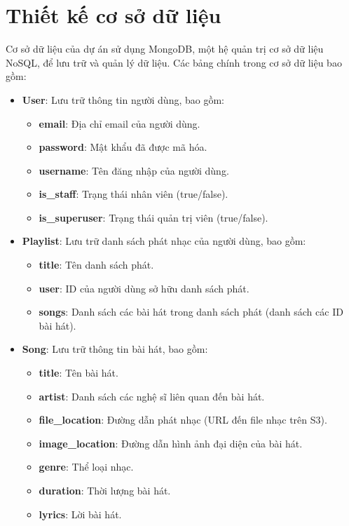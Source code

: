 \section{Thiết kế cơ sở dữ liệu}
Cơ sở dữ liệu của dự án sử dụng MongoDB, một hệ quản trị cơ sở dữ liệu NoSQL, để lưu trữ và quản lý dữ liệu. Các bảng chính trong cơ sở dữ liệu bao gồm:

\begin{itemize}
    \item \textbf{User}: Lưu trữ thông tin người dùng, bao gồm:
    \begin{itemize}
        \item \textbf{email}: Địa chỉ email của người dùng.
        \item \textbf{password}: Mật khẩu đã được mã hóa.
        \item \textbf{username}: Tên đăng nhập của người dùng.
        \item \textbf{is\_staff}: Trạng thái nhân viên (true/false).
        \item \textbf{is\_superuser}: Trạng thái quản trị viên (true/false).
    \end{itemize}

    \item \textbf{Playlist}: Lưu trữ danh sách phát nhạc của người dùng, bao gồm:
    \begin{itemize}
        \item \textbf{title}: Tên danh sách phát.
        \item \textbf{user}: ID của người dùng sở hữu danh sách phát.
        \item \textbf{songs}: Danh sách các bài hát trong danh sách phát (danh sách các ID bài hát).
    \end{itemize}

    \item \textbf{Song}: Lưu trữ thông tin bài hát, bao gồm:
    \begin{itemize}
        \item \textbf{title}: Tên bài hát.
        \item \textbf{artist}: Danh sách các nghệ sĩ liên quan đến bài hát.
        \item \textbf{file\_location}: Đường dẫn phát nhạc (URL đến file nhạc trên S3).
        \item \textbf{image\_location}: Đường dẫn hình ảnh đại diện của bài hát.
        \item \textbf{genre}: Thể loại nhạc.
        \item \textbf{duration}: Thời lượng bài hát.
        \item \textbf{lyrics}: Lời bài hát.
    \end{itemize}


\end{itemize}
